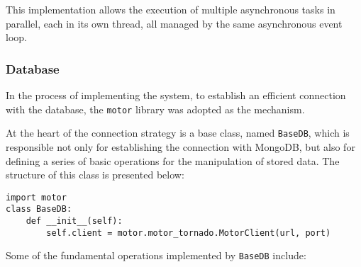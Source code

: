 This implementation allows the execution of multiple asynchronous tasks in parallel, each in its own thread, all managed by the same asynchronous event loop.

\subsubsection{Database}\label{subsubsec:DatabaseImpl}
In the process of implementing the system, to establish an efficient connection with the database, the \texttt{motor} library \cite{motorDocs} was adopted as the mechanism.

At the heart of the connection strategy is a base class, named \texttt{BaseDB}, which is responsible not only for establishing the connection with MongoDB, but also for defining a series of basic operations for the manipulation of stored data. The structure of this class is presented below:

\begin{verbatim}
import motor
class BaseDB:
    def __init__(self):
        self.client = motor.motor_tornado.MotorClient(url, port)
\end{verbatim}

Some of the fundamental operations implemented by \texttt{BaseDB} include:

